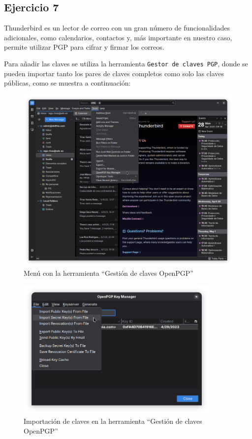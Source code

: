 \subsection{Ejercicio 7}
\graphicspath{ {img/07} }

Thunderbird es un lector de correo con un gran número de funcionalidades adicionales, como calendarios, contactos y, más importante en nuestro caso, permite utilizar PGP para cifrar y firmar los correos.

Para añadir las claves se utiliza la herramienta \texttt{Gestor de claves PGP}, donde se pueden importar tanto los pares de claves completos como solo las claves públicas, como se muestra a continuación:

\begin{figure}[H]
    \includegraphics[width=\textwidth]{thunderbird-tools-menu.png}
    \caption{Menú con la herramienta “Gestión de claves OpenPGP”}
\end{figure}

\begin{figure}[H]
    \includegraphics[width=10cm]{thunderbird-keymanager.png}
    \caption{Importación de claves en la herramienta “Gestión de claves OpenPGP”}
\end{figure}

